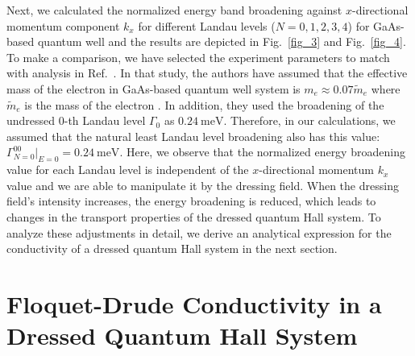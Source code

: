 \documentclass[
 reprint,
 amsmath,amssymb,
 aps,
 prb,
]{revtex4-2}
\begin{document}
Next, we calculated the normalized energy band broadening against $x$-directional momentum component ${k_x}$ for different Landau levels ($N = 0,1,2,3,4$) for GaAs-based quantum well and the results are depicted in Fig.~\ref{fig_3} and Fig.~\ref{fig_4}. To make a comparison, we have selected the experiment parameters to match with analysis in Ref.~\cite{endo09}.
In that study, the authors have assumed that the effective mass of the electron in GaAs-based quantum well system is $m_e \approx 0.07\widetilde{m}_e$ where $\widetilde{m}_e$ is the mass of the electron \cite{endo09,winkler03,wackerl20}. In addition, they used the broadening of the undressed $0$-th Landau level $\Gamma_0$ as $\SI{0.24}{\milli\eV}$. Therefore, in our calculations, we assumed that the natural least Landau level broadening also has this value: $\Gamma^{00}_{N=0}|_{E=0} = \SI{0.24}{\milli\eV}$.
Here, we observe that the normalized energy broadening value for each Landau level is independent of the $x$-directional momentum $k_x$ value and we are able to manipulate it by the dressing field. When the dressing field's intensity increases, the energy broadening is reduced, which leads to changes in the transport properties of the dressed quantum Hall system.
To analyze these adjustments in detail, we derive an analytical expression for the conductivity of a dressed quantum Hall system in the next section.

\section{\label{sec_floquet_drude_conductivity} Floquet-Drude Conductivity in a Dressed Quantum Hall System}
\end{document}

